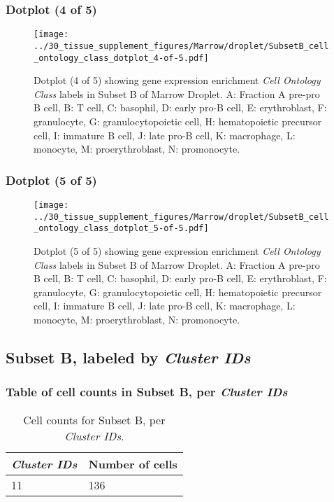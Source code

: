 \clearpage

\subsubsection{Dotplot (4 of 5)}
\begin{figure}[h]
\centering
\texttt{[image: ../30\_tissue\_supplement\_figures/Marrow/droplet/SubsetB\_cell\_ontology\_class\_dotplot\_4-of-5.pdf]}

\caption{ Dotplot (4 of 5)  showing gene expression enrichment \emph{Cell Ontology Class} labels in Subset B of Marrow Droplet. A: Fraction A pre-pro B cell, B: T cell, C: basophil, D: early pro-B cell, E: erythroblast, F: granulocyte, G: granulocytopoietic cell, H: hematopoietic precursor cell, I: immature B cell, J: late pro-B cell, K: macrophage, L: monocyte, M: proerythroblast, N: promonocyte.}
\end{figure}


\clearpage

\subsubsection{Dotplot (5 of 5)}
\begin{figure}[h]
\centering
\texttt{[image: ../30\_tissue\_supplement\_figures/Marrow/droplet/SubsetB\_cell\_ontology\_class\_dotplot\_5-of-5.pdf]}

\caption{ Dotplot (5 of 5)  showing gene expression enrichment \emph{Cell Ontology Class} labels in Subset B of Marrow Droplet. A: Fraction A pre-pro B cell, B: T cell, C: basophil, D: early pro-B cell, E: erythroblast, F: granulocyte, G: granulocytopoietic cell, H: hematopoietic precursor cell, I: immature B cell, J: late pro-B cell, K: macrophage, L: monocyte, M: proerythroblast, N: promonocyte.}
\end{figure}


\clearpage

\subsection{Subset B, labeled by \emph{Cluster IDs}}
\subsubsection{Table of cell counts in Subset B, per \emph{Cluster IDs}}\begin{table}[h]
\centering
\label{my-label}
\begin{tabular}{@{}ll@{}}
\toprule

\emph{Cluster IDs}& Number of cells \\ \midrule
11 & 136 \\
\bottomrule
\end{tabular}
\caption{Cell counts for Subset B, per \emph{Cluster IDs}.}
\end{table}


